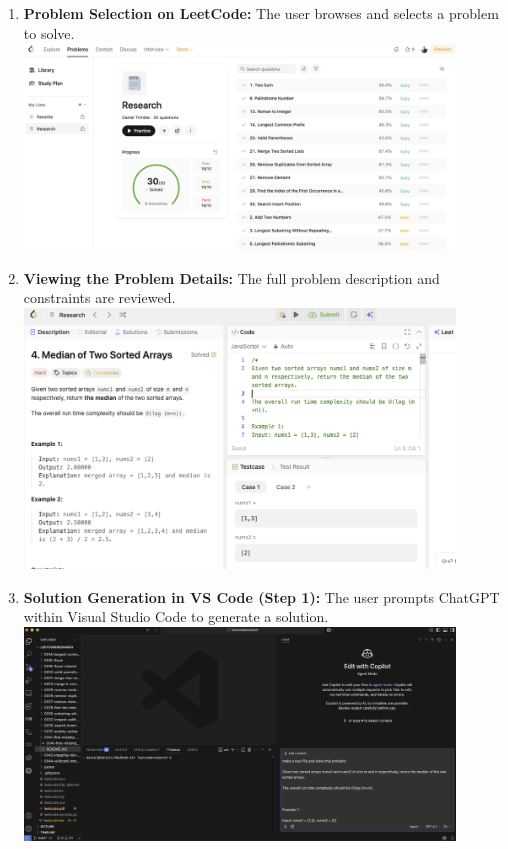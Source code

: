 \documentclass[12pt, a4paper]{article}
\begin{document}
\begin{enumerate}
    \item \textbf{Problem Selection on LeetCode:} The user browses and selects a problem to solve.\\
    \includegraphics[width=0.9\textwidth]{leetcode1.png}
    \item \textbf{Viewing the Problem Details:} The full problem description and constraints are reviewed.\\
    \includegraphics[width=0.9\textwidth]{leetcode2.png}
    \item \textbf{Solution Generation in VS Code (Step 1):} The user prompts ChatGPT within Visual Studio Code to generate a solution.\\
    \includegraphics[width=0.9\textwidth]{vscode1.png}

\end{enumerate}
\end{document}
